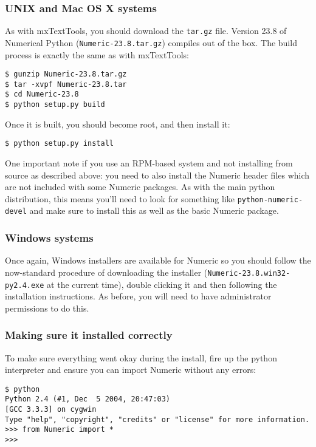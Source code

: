 \documentclass{article}
\begin{document}
\subsubsection{UNIX and Mac OS X systems}

As with mxTextTools, you should download the \verb|tar.gz| file. Version
23.8 of Numerical Python (\verb|Numeric-23.8.tar.gz|) compiles out of the box.
The build process is exactly the same as with mxTextTools:

\begin{verbatim}
$ gunzip Numeric-23.8.tar.gz 
$ tar -xvpf Numeric-23.8.tar
$ cd Numeric-23.8
$ python setup.py build
\end{verbatim}

Once it is built, you should become root, and then install it:

\begin{verbatim}
$ python setup.py install
\end{verbatim}


One important note if you use an RPM-based system and not installing
from source as described above: you need to also
install the Numeric header files which are not included with some
Numeric packages. As with the main python distribution, this means
you'll need to look for something like \verb|python-numeric-devel| 
and make sure to install this as well as the basic Numeric package.

\subsubsection{Windows systems}

Once again, Windows installers are available for Numeric so you should
follow the now-standard procedure of downloading the installer
(\verb|Numeric-23.8.win32-py2.4.exe| at the current time), double
clicking it and then following the installation instructions. As before,
you will need to have administrator permissions to do this.

\subsubsection{Making sure it installed correctly}

To make sure everything went okay during the install, fire up the python
interpreter and ensure you can import Numeric without any errors:

\begin{verbatim}
$ python
Python 2.4 (#1, Dec  5 2004, 20:47:03)
[GCC 3.3.3] on cygwin
Type "help", "copyright", "credits" or "license" for more information.
>>> from Numeric import *
>>>
\end{verbatim}
\end{document}
